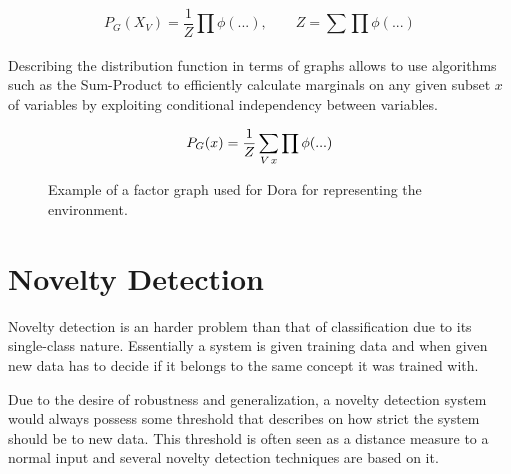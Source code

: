 \documentclass[runningheads,a4paper]{llncs}
\begin{document}
\begin{equation}
P_G(X_V) = \frac{1}{Z}\prod_{}{\phi(...)},\qquad Z = \sum\prod{\phi(...)}
\end{equation}

Describing the distribution function in terms of graphs allows to use algorithms such as the
Sum-Product to efficiently calculate marginals on any given subset $x$ of variables by
exploiting conditional independency between variables.

\begin{equation}
P_G(x) = \frac{1}{Z}\sum_{V \\ x}{\prod{\phi(...)}}
\end{equation}

\begin{figure}[h]
\centering
{}
\caption{Example of a factor graph used for Dora for representing the environment.}
\end{figure}

\section{Novelty Detection}
Novelty detection is an harder problem than that of classification due to its single-class nature.
Essentially a system is given training data and when given new data has to decide if it belongs
to the same concept it was trained with.

Due to the desire of robustness and generalization, a novelty detection system would always possess
some threshold that describes on how strict the system should be to new data.
This threshold is often seen as a distance measure to a normal input and several novelty detection
techniques are based on it.
\end{document}
